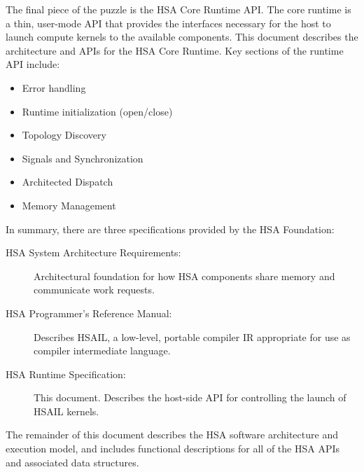 \documentclass[draft]{book}
\begin{document}
The final piece of the puzzle is the HSA Core Runtime API. The core runtime is
a thin, user-mode API that provides the interfaces necessary for the host to
launch compute kernels to the available components. This document describes the
architecture and APIs for the HSA Core Runtime. Key sections of the runtime API
include:
\begin{itemize}
\item Error handling
\item Runtime initialization (open/close)
\item Topology Discovery
\item Signals and Synchronization
\item Architected Dispatch
\item Memory Management
\end{itemize}
In summary, there are three specifications provided by the HSA
Foundation:
\begin{description}
\item[HSA System Architecture Requirements:] Architectural foundation for
how HSA components share memory and communicate work requests.
\item[HSA Programmer's Reference Manual:] Describes HSAIL, a low-level,
portable compiler IR appropriate for use as compiler intermediate
language.
\item[HSA Runtime Specification:] This document. Describes the host-side
API for controlling the launch of HSAIL kernels.
\end{description}

The remainder of this document describes the HSA software architecture and
execution model, and includes functional descriptions for all of the HSA APIs
and associated data structures.
\end{document}
